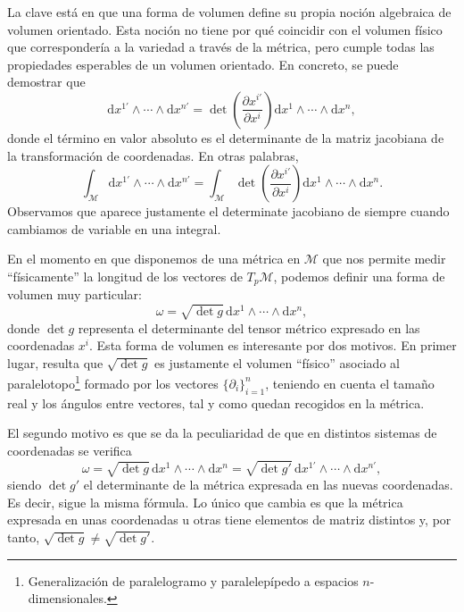 \begin{observation}
    La clave está en que una forma de volumen define su propia noción algebraica de volumen orientado. Esta noción no tiene por qué coincidir con el volumen físico que correspondería a la variedad a través de la métrica, pero cumple todas las propiedades esperables de un volumen orientado. En concreto, se puede demostrar que
    \begin{equation*}
        \mathrm{d}x^{1'}\wedge\cdots\wedge\mathrm{d}x^{n'} = \det\left(\frac{\partial x^{i'}}{\partial x^i}\right) \mathrm{d}x^{1}\wedge\cdots\wedge\mathrm{d}x^{n},
    \end{equation*}
    donde el término en valor absoluto es el determinante de la matriz jacobiana de la transformación de coordenadas. En otras palabras,
    \begin{equation*}
        \int_\mathcal{M} \mathrm{d}x^{1'}\wedge\cdots\wedge\mathrm{d}x^{n'} = \int_\mathcal{M} \det\left(\frac{\partial x^{i'}}{\partial {x^i}}\right) \mathrm{d}x^{1}\wedge\cdots\wedge\mathrm{d}x^{n}.
    \end{equation*}
    Observamos que aparece justamente el determinate jacobiano de siempre cuando cambiamos de variable en una integral. 

    En el momento en que disponemos de una métrica en \(\mathcal{M}\) que nos permite medir ``físicamente'' la longitud de los vectores de \(T_p\mathcal{M}\), podemos definir una forma de volumen muy particular:
    \begin{equation*}
        \omega = \sqrt{\det g}\, \mathrm{d}x^1\wedge\cdots\wedge\mathrm{d}x^n,
    \end{equation*}
    donde \(\det g\) representa el determinante del tensor métrico expresado en las coordenadas \(x^i\). Esta forma de volumen es interesante por dos motivos. En primer lugar, resulta que \(\sqrt{\det g}\) es justamente el volumen ``físico'' asociado al paralelotopo\footnote{Generalización de paralelogramo y paralelepípedo a espacios \(n\)-dimensionales.} formado por los vectores \(\{\partial_i\}_{i=1}^n\), teniendo en cuenta el tamaño real y los ángulos entre vectores, tal y como quedan recogidos en la métrica. 
    
    El segundo motivo es que se da la peculiaridad de que en distintos sistemas de coordenadas se verifica
    \begin{equation*}
        \omega = \sqrt{\det g}\, \mathrm{d}x^1\wedge\cdots\wedge\mathrm{d}x^n = \sqrt{\det g'}\, \mathrm{d}x^{1'}\wedge\cdots\wedge\mathrm{d}x^{n'},
    \end{equation*}
    siendo \(\det g'\) el determinante de la métrica expresada en las nuevas coordenadas. Es decir, sigue la misma fórmula. Lo único que cambia es que la métrica expresada en unas coordenadas u otras tiene elementos de matriz distintos y, por tanto, \(\sqrt{\det g}\neq \sqrt{\det g'}\). 


\end{observation}
